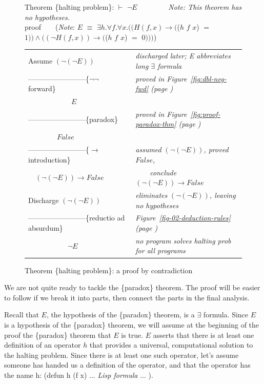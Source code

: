 \begin{figure}
Theorem \{halting problem\}: $\vdash$ $\neg E$ ~~~~~~~~\emph{Note: This theorem has no hypotheses.}\\
proof~~~~(\emph{Note}: $E$ $\equiv$ $\exists h. \forall f. \forall x.
((H(f, x) \rightarrow ($\textsf{($h$ $f$ $x$)} $=$ $1)) \wedge ((\neg H(f, x)) \rightarrow ($\textsf{($h$ $f$ $x$)} $=$ $0)))$)
\begin{center}
\begin{tabular}{ll}
Assume $(\neg(\neg E))$                       &\emph{discharged later; E abbreviates long $\exists$ formula}\\
------------------------\{$\neg \neg$ forward\} &\emph{proved in Figure~\ref{fig:dbl-neg-fwd} (page \pageref{fig:dbl-neg-fwd})}\\
~~~~~~~~~~~~$E$                               &\\
------------------------\{paradox\}           &\emph{proved in Figure~\ref{fig:proof-paradox-thm} (page \pageref{fig:proof-paradox-thm})}\\
~~~~~~~~$False$                               &\\
------------------------\{$\rightarrow$ introduction\} &\emph{assumed} $(\neg(\neg E))$\emph{, proved} $False$\emph{,}\\
~~$(\neg(\neg E)) \rightarrow False$          &~~~~\emph{conclude} $(\neg(\neg E)) \rightarrow False$\\
Discharge $(\neg(\neg E))$                    &\emph{eliminates} $(\neg(\neg E))$\emph{, leaving no hypotheses}\\
------------------------\{reductio ad absurdum\}&\emph{Figure~\ref{fig-02-deduction-rules} (page \pageref{fig-02-deduction-rules})}\\
~~~~~~~~~~~$\neg E$                           &\emph{no program solves halting prob for all programs}\\
\end{tabular}
\end{center}
\caption{Theorem \{halting problem\}: a proof by contradiction}
\label{fig:halting-proof-strategy}
\end{figure}

We are not quite ready to tackle the \{paradox\} theorem.
The proof will be easier to follow if we break it into parts,
then connect the parts in the final analysis.

Recall that $E$, the hypothesis of the \{paradox\} theorem,
is a $\exists$ formula.
Since $E$ is a hypothesis of the \{paradox\} theorem,
we will assume at the beginning of the proof
the \{paradox\} theorem that $E$ is true.
$E$ asserts that there is at least one definition of
an operator $h$ that provides a universal, computational solution
to the halting problem.
Since there is at least one such operator,
let's assume someone has handed us a
definition of the operator, and that the operator has the name h:
\textsf{(defun h (f x)}  $\dots$ \emph{Lisp formula} $\dots$ \textsf{)}.

